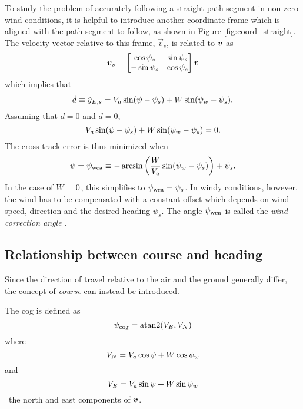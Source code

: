 To study the problem of accurately following a straight path segment in non-zero wind conditions, it is helpful to introduce another 
coordinate frame which is aligned with the path segment to follow, as shown in Figure \ref{fig:coord_straight}. The velocity vector relative to this frame, $\vec{v}_s$, is related to 
$\boldsymbol{v}$ as
\begin{equation}
    \boldsymbol{v}_s=\begin{bmatrix}
        \cos\psi_s & \sin\psi_s \\
        -\sin\psi_s& \cos\psi_s
    \end{bmatrix}\boldsymbol{v}
\end{equation}
which implies that
\begin{equation}
    \dot{d}\equiv\dot{y}_{E,s} = V_a\sin(\psi-\psi_s) + W\sin(\psi_w-\psi_s).
\end{equation}
Assuming that $d=0$ and $\dot{d}=0$,
\begin{equation}
    V_a\sin(\psi-\psi_s) + W\sin(\psi_w-\psi_s)=0.
\end{equation}
The cross-track error is thus minimized when
\begin{equation}\label{eq:wca}
    \psi=\psi_{\text{wca}}\equiv-\arcsin\left(\frac{W}{V_a}\sin(\psi_w-\psi_s)\right) + \psi_s.
\end{equation}
In the case of $W=0$, this simplifies to $\psi_{\text{wca}}=\psi_s$. In windy conditions, however, the wind 
has to be compensated with a constant offset which depends on wind speed, direction and the desired 
heading $\psi_s$. The angle $\psi_{\text{wca}}$ is called the \textit{wind correction angle} \cite{uav_dynamics_wind}.

\subsection{Relationship between course and heading}
Since the direction of travel relative to the air and the ground generally differ, the concept of \textit{course} can instead be
introduced.

\begin{definition}[Course]
    The \ac{cog} is defined as 
    \begin{equation}\label{eq:cog}
        \cog = \atan2(V_E,V_N)
    \end{equation}
    where
    \begin{equation}
        V_N=V_a\cos\psi + W\cos\psi_w
    \end{equation}
    and
    \begin{equation}
        V_E=V_a\sin\psi + W\sin\psi_w
    \end{equation}
    \ie\ the north and east components of $\boldsymbol{v}$.
\end{definition}


